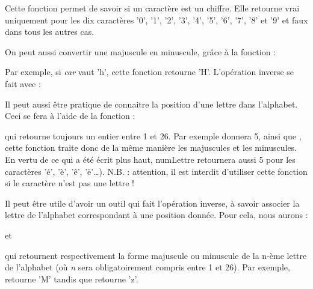 	Cette fonction permet de savoir si un caractère est un chiffre. 
	Elle retourne vrai uniquement pour les dix caractères 
	'0', '1', '2', '3', '4', '5', '6', '7', '8' et '9' 
	et faux dans tous les autres cas.

	On peut aussi convertir une majuscule en minuscule, grâce à la fonction :

	\begin{center}
	\end{center}

	Par exemple, si \textit{car} vaut 'h', 
	cette fonction retourne 'H'. 
	L'opération inverse se fait avec :

	\begin{center}
	\end{center}

	Il peut aussi être pratique de connaitre 
	la position d'une lettre dans l'alphabet. 
	Ceci se fera à l'aide de la fonction :

	\begin{center}
	\end{center}

	qui retourne toujours un entier entre 1 et 26. 
	Par exemple  donnera 5, 
	ainsi que , 
	cette fonction traite donc de la même manière 
	les majuscules et les minuscules. 
	En vertu de ce qui a été écrit plus haut, 
	numLettre retournera aussi 5 pour les caractères 'é', 'è', 'ê', 'ë'\dots). 
	N.B. :  attention, il est interdit d'utiliser cette fonction 
	si le caractère n'est pas une lettre !

	Il peut être utile d'avoir un outil qui fait l'opération inverse, 
	à savoir associer la lettre de l'alphabet correspondant à une position donnée. 
	Pour cela, nous aurons : 

	\begin{center}
	\end{center}
	
	et

	\begin{center}
	\end{center}

	qui retournent respectivement 
	la forme majuscule ou minuscule de la n-ème lettre de l'alphabet 
	(où \textit{n} sera obligatoirement compris entre 1 et 26). 
	Par exemple,  retourne 'M' 
	tandis que  retourne 'z'.

